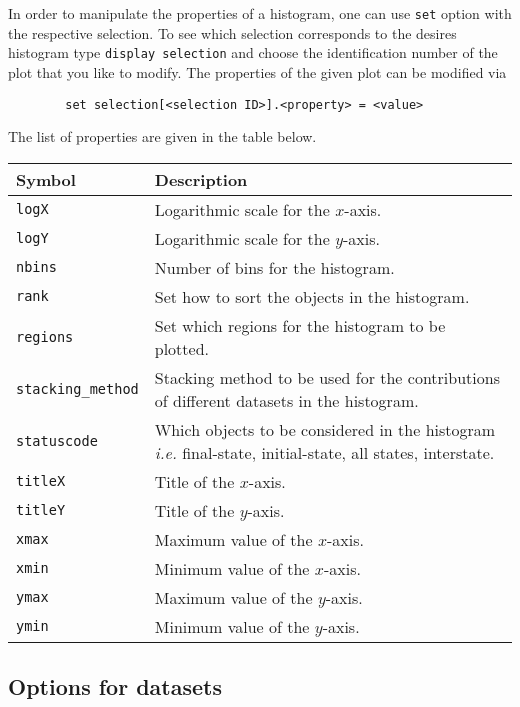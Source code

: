 \documentclass[a4paper]{article}
\begin{document}
In order to manipulate the properties of a histogram, one can use \texttt{set} option with the respective selection. To see which selection corresponds to the desires histogram type \texttt{display selection} and choose the identification number of the plot that you like to modify. The properties of the given plot can be modified via
{\color{ao} \begin{verbatim}
		set selection[<selection ID>].<property> = <value>
\end{verbatim}}
\noindent The list of properties are given in the table below.

\renewcommand{\arraystretch}{1.2}%
\begin{center}\begin{tabular}{l p{9.4cm}}
		\hline
		Symbol& Description\\
		\hline
		\color{ao} \verb?logX?     & Logarithmic scale for the $x$-axis.\\
		\color{ao} \verb?logY?    & Logarithmic scale for the $y$-axis.\\
		\color{ao} \verb?nbins?   & Number of bins for the histogram.\\
		\color{ao} \verb?rank?     & Set how to sort the objects in the histogram.		\\
		\color{ao} \verb?regions?    & Set which regions for the histogram to be plotted.\\
		\color{ao} \verb?stacking_method?    &  Stacking method to be used for the contributions of different datasets in the histogram.\\
		\color{ao} \verb?statuscode?    & Which objects to be considered in the histogram {\it i.e.} final-state, initial-state, all states, interstate.\\
		\color{ao} \verb?titleX?    & Title of the $x$-axis.\\
		\color{ao} \verb?titleY?      & Title of the $y$-axis.\\
		\color{ao} \verb?xmax?    & Maximum value of the $x$-axis.\\
		\color{ao} \verb?xmin?  & Minimum value of the $x$-axis.\\
		\color{ao} \verb?ymax?    & Maximum value of the $y$-axis.\\
		\color{ao} \verb?ymin?          & Minimum value of the $y$-axis.\\\hline
	\end{tabular}
\end{center}

\vspace{2cm}
\begin{shaded}
\section{\Large Options for datasets}
\label{sec:datasets}
\end{shaded}
\end{document}
